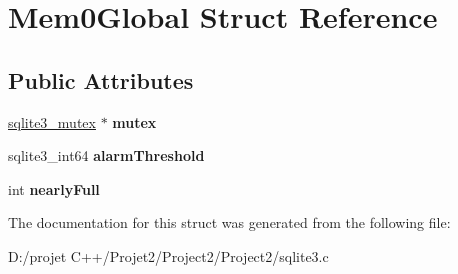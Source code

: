 \hypertarget{struct_mem0_global}{}\section{Mem0\+Global Struct Reference}
\label{struct_mem0_global}
\subsection*{Public Attributes}
\begin{DoxyCompactItemize}
\item 
\mbox{\label{struct_mem0_global_a0985f5cdd621da934ca6031d3dd687ce}} 
\mbox{\hyperlink{structsqlite3__mutex}{sqlite3\+\_\+mutex}} $\ast$ {\bfseries mutex}
\item 
\mbox{\label{struct_mem0_global_a670fa6f318f559240b47d6833c079a8b}} 
sqlite3\+\_\+int64 {\bfseries alarm\+Threshold}
\item 
\mbox{\label{struct_mem0_global_ac7e4f6ca687383da63be050d7a09f453}} 
int {\bfseries nearly\+Full}
\end{DoxyCompactItemize}


The documentation for this struct was generated from the following file\+:\begin{DoxyCompactItemize}
\item 
D\+:/projet C++/\+Projet2/\+Project2/\+Project2/sqlite3.\+c\end{DoxyCompactItemize}
